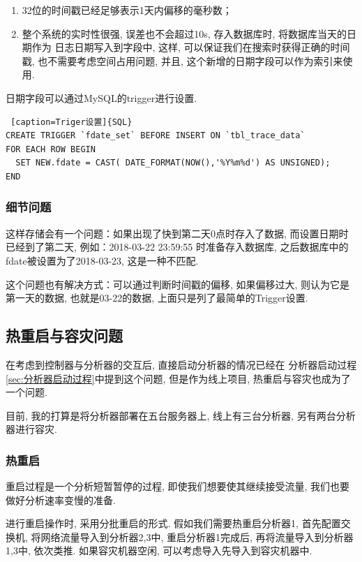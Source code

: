\begin{enumerate}
\def\labelenumi{\arabic{enumi}.}
\item
  32位的时间戳已经足够表示1天内偏移的毫秒数；
\item
  整个系统的实时性很强, 误差也不会超过10s, 存入数据库时,
  将数据库当天的日期作为 日志日期写入到字段中, 这样,
  可以保证我们在搜索时获得正确的时间戳, 也不需要考虑空间占用问题, 并且,
  这个新增的日期字段可以作为索引来使用.
\end{enumerate}

日期字段可以通过MySQL的trigger进行设置.


\begin{lstlisting} [caption=Triger设置]{SQL}
CREATE TRIGGER `fdate_set` BEFORE INSERT ON `tbl_trace_data`
FOR EACH ROW BEGIN
  SET NEW.fdate = CAST( DATE_FORMAT(NOW(),'%Y%m%d') AS UNSIGNED);
END
\end{lstlisting}

\subsubsection{细节问题}

这样存储会有一个问题：如果出现了快到第二天0点时存入了数据,
而设置日期时已经到了第二天, 例如：2018-03-22 23:59:55 时准备存入数据库,
之后数据库中的fdate被设置为了2018-03-23, 这是一种不匹配.

这个问题也有解决方式：可以通过判断时间戳的偏移, 如果偏移过大, 则认为它是
第一天的数据, 也就是03-22的数据, 上面只是列了最简单的Trigger设置.

\subsection{热重启与容灾问题}
\label{sec:热重启与容灾问题}

在考虑到控制器与分析器的交互后, 直接启动分析器的情况已经在
分析器启动过程\ref{sec:分析器启动过程}中提到这个问题,
但是作为线上项目, 热重启与容灾也成为了一个问题.

目前, 我的打算是将分析器部署在五台服务器上, 线上有三台分析器, 另有两台分析器进行容灾.

\subsubsection{热重启}

重启过程是一个分析短暂暂停的过程, 即使我们想要使其继续接受流量,
我们也要做好分析速率变慢的准备.


进行重启操作时, 采用分批重启的形式. 假如我们需要热重启分析器1,
首先配置交换机, 将网络流量导入到分析器2,3中, 重启分析器1完成后,
再将流量导入到分析器1,3中, 依次类推. 如果容灾机器空闲,
可以考虑导入先导入到容灾机器中.

